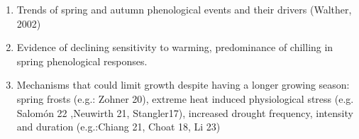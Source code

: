 \documentclass{article}
\begin{document}
\begin{enumerate}
	\item  Trends of spring and autumn phenological events and their drivers (Walther, 2002)
	\item Evidence of declining sensitivity to warming, predominance of chilling in spring phenological responses. 
	\item Mechanisms that could limit growth despite having a longer growing season: spring frosts (e.g.: Zohner 20), extreme heat induced physiological stress (e.g. Salomón 22 ,Neuwirth 21, Stangler17), increased drought frequency, intensity and duration (e.g.:Chiang 21, Choat 18, Li 23)


\end{enumerate}
\end{document}
